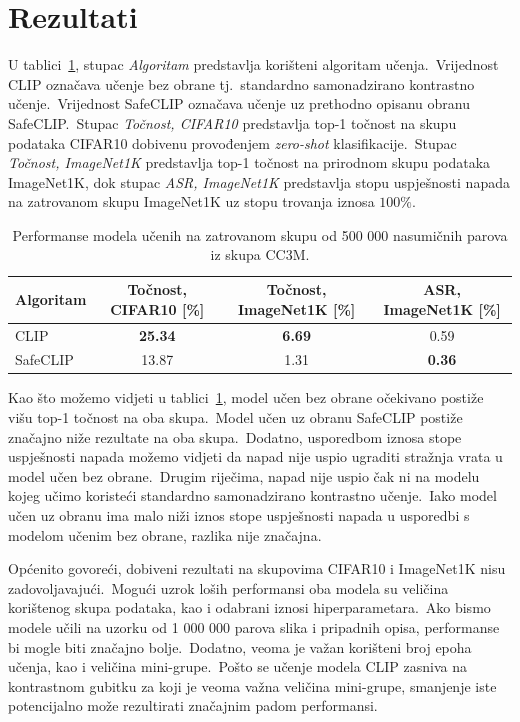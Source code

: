 \documentclass[times, utf8, seminar, numeric]{fer}
\begin{document}
\section{Rezultati}

U tablici~\ref{tbl:performanse_zatrovano}, stupac \textit{Algoritam} predstavlja korišteni algoritam učenja.\ Vrijednost CLIP označava učenje bez obrane tj.\ standardno samonadzirano kontrastno učenje.\ 
Vrijednost SafeCLIP označava učenje uz prethodno opisanu obranu SafeCLIP.\ Stupac \textit{Točnost, CIFAR10} predstavlja top-1 točnost na skupu podataka CIFAR10 dobivenu provođenjem \textit{zero-shot} klasifikacije.\ 
Stupac \textit{Točnost, ImageNet1K} predstavlja top-1 točnost na prirodnom skupu podataka ImageNet1K, dok stupac \textit{ASR, ImageNet1K} predstavlja stopu uspješnosti napada na zatrovanom skupu ImageNet1K uz stopu trovanja iznosa $100\%$.\

\begin{table}[htb]
    \caption{Performanse modela učenih na zatrovanom skupu od 500 000 nasumičnih parova iz skupa CC3M.}
    \label{tbl:performanse_zatrovano}
    \centering
    \begin{tabular}{lccc} \hline
    Algoritam & Točnost, CIFAR10 [\%] & Točnost, ImageNet1K [\%] & ASR, ImageNet1K [\%] \\ \hline
    CLIP & \textbf{25.34} & \textbf{6.69} & 0.59 \\
    SafeCLIP & 13.87 & 1.31 & \textbf{0.36} \\
    \end{tabular}
\end{table}

Kao što možemo vidjeti u tablici~\ref{tbl:performanse_zatrovano}, model učen bez obrane očekivano postiže višu top-1 točnost na oba skupa.\ 
Model učen uz obranu SafeCLIP postiže značajno niže rezultate na oba skupa.\ Dodatno, usporedbom iznosa stope uspješnosti napada možemo vidjeti da napad nije uspio ugraditi stražnja vrata u model učen bez obrane.\ 
Drugim riječima, napad nije uspio čak ni na modelu kojeg učimo koristeći standardno samonadzirano kontrastno učenje.\ Iako model učen uz obranu ima malo niži iznos stope uspješnosti napada u usporedbi s modelom učenim bez obrane, razlika nije značajna.\ 
  
Općenito govoreći, dobiveni rezultati na skupovima CIFAR10 i ImageNet1K nisu zadovoljavajući.\ Mogući uzrok loših performansi oba modela su veličina korištenog skupa podataka, kao i odabrani iznosi hiperparametara.\
Ako bismo modele učili na uzorku od 1 000 000 parova slika i pripadnih opisa, performanse bi mogle biti značajno bolje.\ Dodatno, veoma je važan korišteni broj epoha učenja, kao i veličina mini-grupe.\ 
Pošto se učenje modela CLIP zasniva na kontrastnom gubitku za koji je veoma važna veličina mini-grupe, smanjenje iste potencijalno može rezultirati značajnim padom performansi.\
\end{document}
